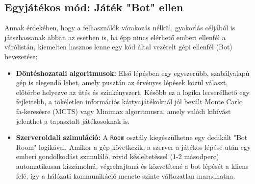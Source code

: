 \subsection{Egyjátékos mód: Játék "Bot" ellen}
Annak érdekében, hogy a felhasználók várakozás nélkül, gyakorlás céljából is játszhassanak abban az esetben is, ha épp nincs elérhető emberi ellenfél a várólistán, kiemelten hasznos lenne egy kód által vezérelt gépi ellenfél (Bot) bevezetése:
\begin{itemize}
    \item \textbf{Döntéshozatali algoritmusok:} Első lépésben egy egyszerűbb, szabályalapú gép is elegendő lehet, amely pusztán az érvényes lépések közül választ, előtérbe helyezve az ütés és színkényszert. Később ez a logika lecserélhető egy fejlettebb, a tökéletlen információs kártyajátékoknál jól bevált Monte Carlo fa-keresésre (MCTS) vagy Minimax algoritmusra, amely valódi kihívást jelenthet a tapasztalt játékosoknak is.
    \item \textbf{Szerveroldali szimuláció:} A \texttt{Room} osztály kiegészülhetne egy dedikált "Bot Room" logikával. Amikor a gép következik, a szerver a játékos lépése után egy emberi gondolkodást szimuláló, rövid késleltetéssel (1-2 másodperc) automatikusan kiszámolná, végrehajtaná és közvetítené a bot lépését a kliens felé, így a hálózati kommunikáció menete szinte változatlan maradhatna.
\end{itemize}